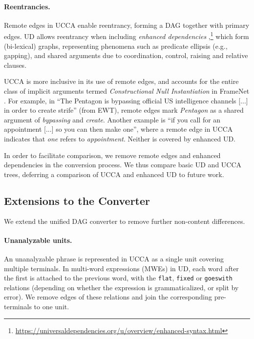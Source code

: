 \documentclass[11pt,a4paper,table]{article}
\begin{document}
\paragraph{Reentrancies.}
Remote edges in UCCA enable reentrancy, forming a DAG together with primary edges.
UD allows reentrancy when including \textit{enhanced dependencies}
\cite{SCHUSTER16.779},\footnote{\url{https://universaldependencies.org/u/overview/enhanced-syntax.html}} which form (bi-lexical) graphs, representing phenomena
such as predicate ellipsis (e.g., gapping),
and shared arguments due to coordination, control, raising and relative clauses.

UCCA is more inclusive in its use of remote edges, and accounts for 
the entire class of implicit arguments termed {\it Constructional Null Instantiation} in FrameNet \citep{Ruppenhofer:16}.
For example, in
``The Pentagon is bypassing official US intelligence channels [...] in order to create strife'' (from EWT),
remote edges mark \textit{Pentagon} as a shared argument of \textit{bypassing} and
\textit{create}. 
Another example is ``if you call for an appointment [...] so you can then make one'',
where a remote edge in UCCA indicates that \textit{one} refers to \textit{appointment}.
Neither is covered by enhanced UD.

In order to facilitate comparison, we remove remote edges and enhanced dependencies in the conversion process.
We thus compare basic UD and UCCA trees, deferring a comparison of UCCA and enhanced UD to future work.



\subsection{Extensions to the Converter}\label{sec:local}

We extend the unified DAG converter to remove further non-content differences.

\paragraph{Unanalyzable units.}
An unanalyzable phrase is represented in UCCA as a single unit covering multiple terminals.
In multi-word expressions (MWEs) in UD, each word after the first is attached to the previous word,
with the \texttt{flat}, \texttt{fixed} or \texttt{goeswith} relations
(depending on whether the expression is grammaticalized, or split by error).
We remove edges of these relations and join the corresponding pre-terminals to one unit.
\end{document}
